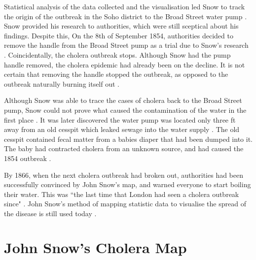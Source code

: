 \documentclass[12pt]{article}
\begin{document}
Statistical analysis of the data collected and the visualisation led Snow to track the origin of the outbreak in the Soho district to the Broad Street water pump \cite{test}.
Snow provided his research to authorities, which were still sceptical about his findings. Despite this, On the 8th of September 1854, authorities decided to remove the handle from the Broad Street pump as a trial due to Snow's research \cite{ucla, youtube}. Coincidentally, the cholera outbreak stops. Although Snow had the pump handle removed, the cholera epidemic had already been on the decline. It is not certain that removing the handle stopped the outbreak, as opposed to the outbreak naturally burning itself out \cite{original}.

Although Snow was able to trace the cases of cholera back to the Broad Street pump, Snow could not prove what caused the contamination of the water in the first place \cite{ucla}. It was later discovered the water pump was located only three ft away from an old cesspit which leaked sewage into the water supply \cite{channel1, heros}. The old cesspit contained fecal matter from a babies diaper that had been dumped into it. The baby had contracted cholera from an unknown source, and had caused the 1854 outbreak \cite{heros, tedtalk, johnson}. 

By 1866, when the next cholera outbreak had broken out, authorities had been successfully convinced by John Snow's map, and warned everyone to start boiling their water. This was ``the last time that London had seen a cholera outbreak since" \cite{tedtalk}. John Snow's method of mapping statistic data to visualise the spread of the disease is still used today \cite{channel1}. 

\section{John Snow's Cholera Map}
\end{document}
